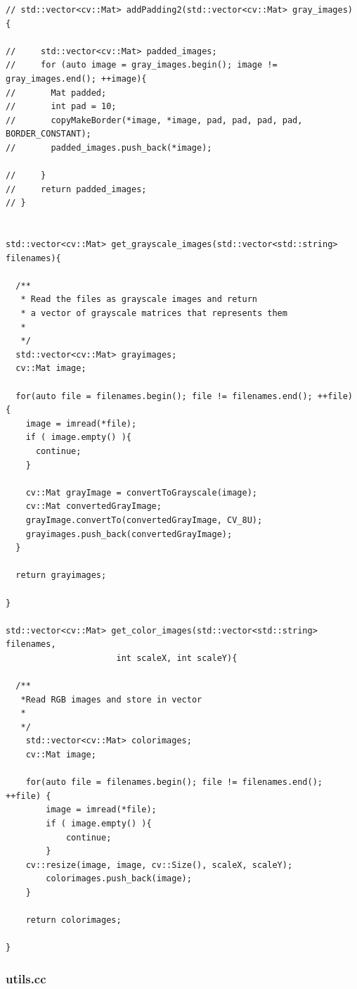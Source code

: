 \documentclass[letterpaper,11pt]{article}
\begin{document}
\begin{verbatim}
// std::vector<cv::Mat> addPadding2(std::vector<cv::Mat> gray_images) {

//     std::vector<cv::Mat> padded_images;
//     for (auto image = gray_images.begin(); image != gray_images.end(); ++image){
//       Mat padded;
//       int pad = 10;
//       copyMakeBorder(*image, *image, pad, pad, pad, pad, BORDER_CONSTANT);
//       padded_images.push_back(*image);

//     }
//     return padded_images;
// }


std::vector<cv::Mat> get_grayscale_images(std::vector<std::string> filenames){

  /**
   * Read the files as grayscale images and return
   * a vector of grayscale matrices that represents them
   *
   */
  std::vector<cv::Mat> grayimages;
  cv::Mat image;

  for(auto file = filenames.begin(); file != filenames.end(); ++file) {
    image = imread(*file);
    if ( image.empty() ){
      continue;
    }

    cv::Mat grayImage = convertToGrayscale(image);
    cv::Mat convertedGrayImage;
    grayImage.convertTo(convertedGrayImage, CV_8U);
    grayimages.push_back(convertedGrayImage);
  }

  return grayimages;

}

std::vector<cv::Mat> get_color_images(std::vector<std::string> filenames,
				      int scaleX, int scaleY){

  /**
   *Read RGB images and store in vector
   *
   */
    std::vector<cv::Mat> colorimages;
    cv::Mat image;

    for(auto file = filenames.begin(); file != filenames.end(); ++file) {
        image = imread(*file);
        if ( image.empty() ){
            continue;
        }
	cv::resize(image, image, cv::Size(), scaleX, scaleY);
        colorimages.push_back(image);
    }

    return colorimages;

}
\end{verbatim}

\subsubsection{utils.cc}
\end{document}
